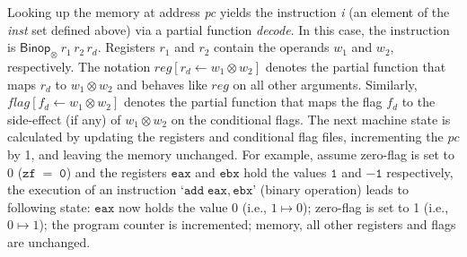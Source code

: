 Looking up the memory at address \textit{pc} yields the instruction \textit{i} (an element of the \textit{inst} set defined above) via a partial function \textit{decode}. In this case, the instruction is $\mathsf{Binop_\otimes} \: r_1\, r_2\, r_d$. Registers $r_1$ and $r_2$ contain the operands $w_1$ and $w_2$, respectively. The notation $reg[r_d \leftarrow w_1 \otimes w_2]$ denotes the partial function that maps $r_d$ to $w_1 \otimes w_2$ and behaves like $reg$ on all other arguments. Similarly, $flag[f_d \leftarrow w_1 \otimes w_2]$ denotes the partial function that maps the flag $f_d$ to the side-effect  (if any) of $w_1 \otimes w_2$ on the conditional flags. The next machine state is calculated by updating the registers and conditional flag files, incrementing the $pc$ by 1, and leaving the memory unchanged. For example, assume zero-flag is set to 0 ($\mathtt{zf\;=\;0}$) and the registers $\mathtt{eax}$ and $\mathtt{ebx}$ hold the values $\mathtt{1}$ and $\mathtt{- 1}$ respectively, the execution of an instruction `$\mathtt{add\;eax, ebx}$' (binary operation) leads to following state: $\mathtt{eax}$ now holds the value 0 (i.e., $1\mapsto0$); zero-flag is set to 1 (i.e., $0\mapsto1$); the program counter is incremented; memory, all other registers and flags are unchanged.



